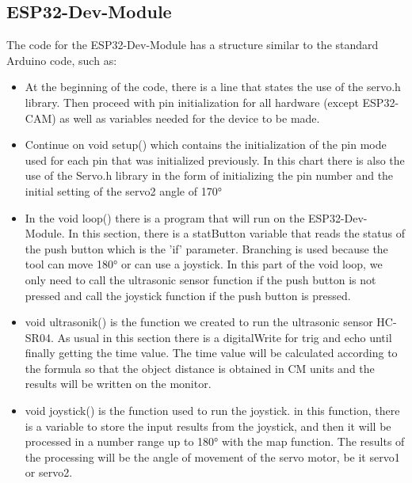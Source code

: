 \documentclass[conference]{IEEEtran}
\begin{document}
\subsection{ESP32-Dev-Module}
The code for the ESP32-Dev-Module has a structure similar to the standard Arduino code, such as:
\begin{itemize}
\item At the beginning of the code, there is a line that states the use of the servo.h library. Then proceed with pin initialization for all hardware (except ESP32-CAM) as well as variables needed for the device to be made.
\item Continue on void setup() which contains the initialization of the pin mode used for each pin that was initialized previously. In this chart there is also the use of the Servo.h library in the form of initializing the pin number and the initial setting of the servo2 angle of 170°
\item In the void loop() there is a program that will run on the ESP32-Dev-Module. In this section, there is a statButton variable that reads the status of the push button which is the 'if' parameter. Branching is used because the tool can move 180° or can use a joystick. In this part of the void loop, we only need to call the ultrasonic sensor function if the push button is not pressed and call the joystick function if the push button is pressed.
\item void ultrasonik() is the function we created to run the ultrasonic sensor HC-SR04. As usual in this section there is a digitalWrite for trig and echo until finally getting the time value. The time value will be calculated according to the formula so that the object distance is obtained in CM units and the results will be written on the monitor.
\item void joystick() is the function used to run the joystick. in this function, there is a variable to store the input results from the joystick, and then it will be processed in a number range up to 180° with the map function. The results of the processing will be the angle of movement of the servo motor, be it servo1 or servo2.
\end{itemize}
\end{document}
